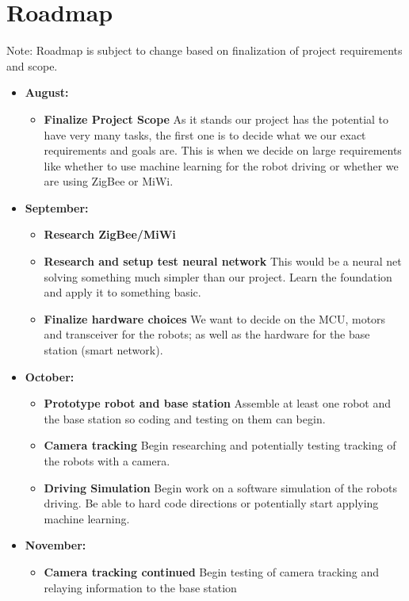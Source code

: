 \documentclass[a4paper]{article}
\begin{document}
	\section*{Roadmap}
	Note: Roadmap is subject to change based on finalization of project requirements and scope.
	\begin{itemize}
		\item \textbf{August:}
			\begin{itemize}
				\item \textbf{Finalize Project Scope} As it stands our project has the potential to have very many tasks, the first one is to decide what we our exact requirements and goals are. This is when we decide on large requirements like whether to use machine learning for the robot driving or whether we are using ZigBee or MiWi.
			\end{itemize}
		\item \textbf{September:}
			\begin{itemize}
				\item \textbf{Research ZigBee/MiWi}
				\item \textbf{Research and setup test neural network} This would be a neural net solving something much simpler than our project. Learn the foundation and apply it to something basic.
				\item \textbf{Finalize hardware choices} We want to decide on the MCU, motors and transceiver for the robots; as well as the hardware for the base station (smart network).
			\end{itemize}
		\item \textbf{October:}
			\begin{itemize}
				\item \textbf{Prototype robot and base station} Assemble at least one robot and the base station so coding and testing on them can begin.
				\item \textbf{Camera tracking} Begin researching and potentially testing tracking of the robots with a camera.
				\item \textbf{Driving Simulation} Begin work on a software simulation of the robots driving. Be able to hard code directions or potentially start applying machine learning.
			\end{itemize}
		\item \textbf{November:}
			\begin{itemize}
				\item \textbf{Camera tracking continued} Begin testing of camera tracking and relaying information to the base station

\end{itemize}
\end{itemize}
\end{document}
